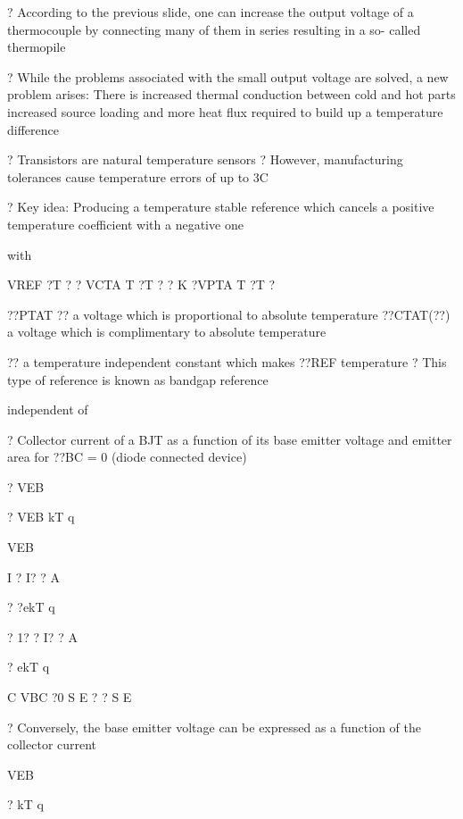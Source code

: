 \documentclass[2pt,landscape]{article}
\begin{document}
\begin{multicols*}{5}
?	According to the previous slide, one can increase the output voltage of 
a thermocouple by connecting many of them in series resulting in a so- 
called thermopile









?	While the problems associated with the small output voltage are 
solved, a new problem arises:
\textbullet 	There is increased thermal conduction between cold and hot parts 
increased source loading and more heat flux required to build up
a temperature difference



?	Transistors are natural 
temperature sensors
?	However, manufacturing 
tolerances cause temperature 
errors of up to 3\textbullet C





?	Key idea:
Producing a temperature stable reference which cancels a positive 
temperature coefficient with a negative one



with


VREF 
?T ? 
? 
VCTA
T ?T 
? ? 
K 
?VPTA
T ?T 
?


??PTAT ??	a voltage which is proportional to absolute temperature
??CTAT(??) a voltage which is complimentary to absolute temperature


?? a temperature independent constant which makes ??REF
temperature
?	This type of reference is known as bandgap reference


independent of





?	Collector current of a BJT as a function of its base emitter voltage and 
emitter area for ??BC = 0 (diode connected device)


?	VEB


? VEB \textbullet kT q


VEB


I	? I? ? A


? ?ekT q


? 1?	?	I? ? A


? ekT q


C VBC ?0	S	E	?	?	S	E

?	Conversely, the base emitter voltage can be expressed as a function of 
the collector current


VEB


? kT
q



\end{multicols*}
\end{document}
